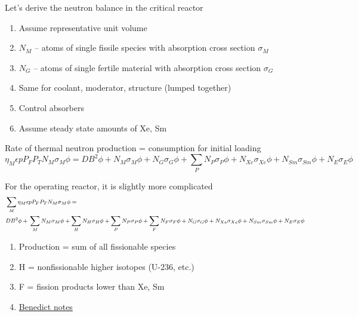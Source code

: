 \documentclass[aspectratio=1610,pdftex,dvipsnames,compress,xcolor={dvipsnames}]{beamer}
\begin{document}
\begin{frame}{Let's derive the neutron balance in the critical reactor}
    \begin{enumerate}[series=outerlist,topsep=0pt,itemsep=21pt,leftmargin=*,label=(\arabic*)]
        \item[]Assume representative unit volume
        \item[]$N_M$ -- atoms of single fissile species with absorption cross section $\sigma_M$
        \item[]$N_G$ -- atoms of single fertile material with absorption cross section $\sigma_G$
        \item[]Same for coolant, moderator, structure (lumped together)
        \item[]Control absorbers
        \item[]Assume steady state amounts of Xe, Sm
    \end{enumerate}
\end{frame}


\begin{frame}{Rate of thermal neutron production = consumption for initial loading}
    \begin{equation}
        \eta_M \epsilon p P_F P_T N_M \sigma_M \phi = DB^2\phi + N_M\sigma_M\phi + N_G\sigma_G\phi + \sum_P N_P\sigma_P\phi +  N_{Xe}\sigma_{Xe}\phi + N_{Sm}\sigma_{Sm}\phi + N_E\sigma_E\phi
    \end{equation}
\end{frame}


\begin{frame}{For the operating reactor, it is slightly more complicated}
    \begin{equation}
        \footnotesize
        \begin{aligned}
            & \sum_M\eta_M \epsilon p P_F P_T N_M \sigma_M \phi = 
            \\
            & DB^2\phi +  \newline \sum_MN_M\sigma_M\phi +  \sum_HN_H\sigma_H\phi +  \sum_P N_P\sigma_P\phi +  \sum_FN_F\sigma_F\phi +  N_G\sigma_G\phi +  N_{Xe}\sigma_{Xe}\phi +  N_{Sm}\sigma_{Sm}\phi +  N_E\sigma_E\phi
        \end{aligned}
    \end{equation}

    \vspace*{\fill}

    \begin{enumerate}[series=outerlist,topsep=0pt,itemsep=21pt,leftmargin=*,label=(\arabic*)]
        \item[]Production = sum of all fissionable species
        \item[]H = nonfissionable higher isotopes (U-236, etc.)
        \item[]F = fission products lower than Xe, Sm
        \item[]\href{https://piazza.com/class_profile/get_resource/ll13mxo3tb15l/ll1g94jnkby5jr}{Benedict notes}
    \end{enumerate}
\end{frame}
\end{document}
